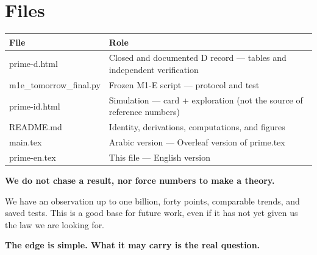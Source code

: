 \documentclass[12pt,a4paper]{article}
\begin{document}
\section{Files}

\begin{table}[h]
\centering
\begin{tabular}{ll}
\toprule
File & Role \\
\midrule
prime-d.html & Closed and documented D record — tables and independent verification \\
m1e\_tomorrow\_final.py & Frozen M1-E script — protocol and test \\
prime-id.html & Simulation — card + exploration (not the source of reference numbers) \\
README.md & Identity, derivations, computations, and figures \\
main.tex & Arabic version — Overleaf version of prime.tex \\
prime-en.tex & This file — English version \\
\bottomrule
\end{tabular}
\end{table}

\vspace{1em}
\begin{center}
\textbf{We do not chase a result, nor force numbers to make a theory.}

We have an observation up to one billion, forty points, comparable trends, and saved tests. This is a good base for future work, even if it has not yet given us the law we are looking for.

\textbf{The edge is simple. What it may carry is the real question.}
\end{center}
\end{document}
